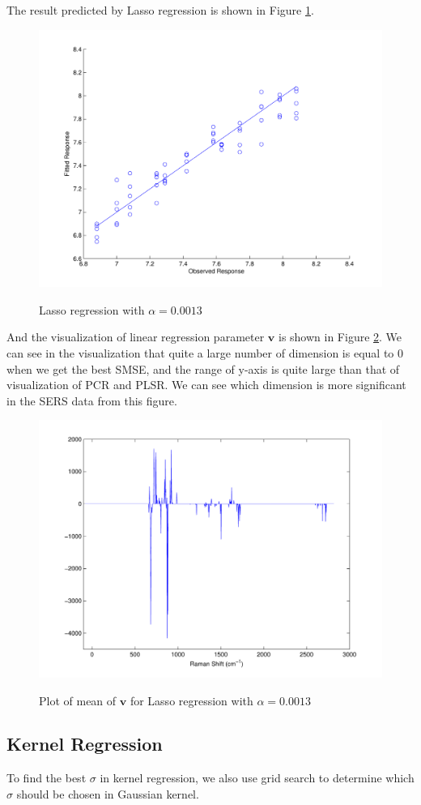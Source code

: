 \documentclass[a4paper]{article}
\newcommand{\bfv}{\mathbf{v}}
\begin{document}
The result predicted by Lasso regression is shown in Figure \ref{pic_lasso2}.
\begin{figure}[h]
  \centering
  \includegraphics[width=.6\textwidth]{images/predict_lasso.pdf}\\
  \caption{Lasso regression with $\alpha=0.0013$}\label{pic_lasso2}
\end{figure}

And the visualization of linear regression parameter $\bfv$ is shown in Figure \ref{pic_lasso3}. We can see in the visualization that quite a large number of dimension is equal to 0 when we get the best SMSE, and the range of y-axis is quite large than that of visualization of PCR and PLSR. We can see which dimension is more significant in the SERS data from this figure.
\begin{figure}[h]
  \centering
  \includegraphics[width=.6\textwidth]{images/v_lasso.pdf}\\
  \caption{Plot of mean of $\bfv$ for Lasso regression with $\alpha=0.0013$}\label{pic_lasso3}
\end{figure}

\subsection{Kernel Regression}
To find the best $\sigma$ in kernel regression, we also use grid search to determine which $\sigma$ should be chosen in Gaussian kernel.
\end{document}
